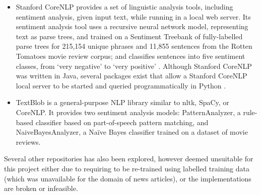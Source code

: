 \documentclass{report}
\begin{document}
\begin{itemize}
	\item Stanford CoreNLP \cite{StanfordNLP} provides a set of linguistic analysis tools, including sentiment analysis, given input text, while running in a local web server.
		Its sentiment analysis tool uses a recursive neural network model, representing text as parse trees, and trained on a Sentiment Treebank of fully-labelled parse trees for 215,154 unique phrases and 11,855 sentences from the Rotten Tomatoes movie review corpus; and classifies sentences into five sentiment classes, from `very negative' to `very positive' \cite{socher2013recursive}.
		Although Stanford CoreNLP was written in Java, several packages exist that allow a Stanford CoreNLP local server to be started and queried programmatically in Python \cite{stanfordcorenlp}.
	\item TextBlob is a general-purpose NLP library similar to nltk, SpaCy, or CoreNLP.
		It provides two sentiment analysis models: PatternAnalyzer, a rule-based classifier based on part-of-speech pattern matching, and NaiveBayesAnalyzer, a Na\"{i}ve Bayes classifier trained on a dataset of movie reviews. \cite{textblob}
\end{itemize}
Several other repositories has also been explored, however deemed unsuitable for this project either due to requiring to be re-trained using labelled training data (which was unavailable for the domain of news articles), or the implementations are broken or infeasible.
\end{document}

